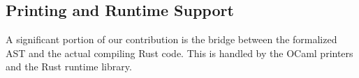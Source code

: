 \documentclass{llncs} %
\begin{document}




\subsection{Printing and Runtime Support}
\label{ssec:print-runtime}

A significant portion of our contribution is the bridge between the formalized AST and the actual compiling Rust code. This is handled by the OCaml printers and the Rust runtime library.
\end{document}
